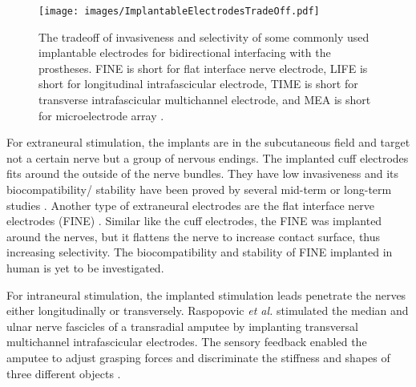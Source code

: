  \begin{figure}[htb]
    \centering
       \texttt{[image: images/ImplantableElectrodesTradeOff.pdf]}
        \caption{The tradeoff of invasiveness and selectivity of some commonly used implantable electrodes for bidirectional interfacing with the prostheses. FINE is short for flat interface nerve electrode, LIFE is short for longitudinal intrafascicular electrode, TIME is short for transverse intrafascicular multichannel electrode, and MEA is short for microelectrode array \cite{ortiz2012viability}.}
        \label{fig:implanted_electrodes_tradeoff}
\end{figure}

For extraneural stimulation, the implants are in the subcutaneous field and target not a certain nerve but a group of nervous endings. The implanted cuff electrodes fits around the outside of the nerve bundles. They have low invasiveness and its biocompatibility/ stability have been proved by several mid-term or long-term studies \cite{christie2017longterm, tan2014neural}. Another type of extraneural electrodes are the flat interface nerve electrodes (FINE) \cite{tyler2002functionally}. Similar like the cuff electrodes, the FINE was implanted around the nerves, but it flattens the nerve to increase contact surface, thus increasing selectivity. The biocompatibility and stability of FINE implanted in human is yet to be investigated.  

For intraneural stimulation, the implanted stimulation leads penetrate the nerves either longitudinally or transversely. Raspopovic \textit{et al.} stimulated the median and ulnar nerve fascicles of a transradial amputee by implanting transversal multichannel intrafascicular electrodes. The sensory feedback enabled the amputee to adjust grasping forces and discriminate the stiffness and shapes of three different objects \cite{raspopovic2014restoring}. 


